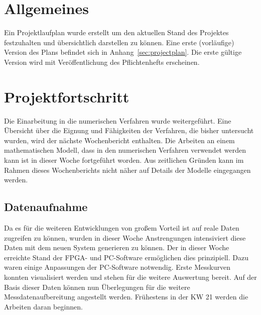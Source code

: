 \documentclass[a4paper,12pt,fleqn]{article}
\begin{document}
\setlength{\headheight}{36pt}

\begin{titlepage}



\end{titlepage}

\section[Allgemeines]{Allgemeines}
Ein Projektlaufplan wurde erstellt um den aktuellen Stand des Projektes festzuhalten und übersichtlich darstellen zu können. Eine erste (vorläufige) Version des Plans befindet sich in Anhang~\ref{sec:projectplan}. Die erste gültige Version wird mit Veröffentlichung des Pflichtenhefts erscheinen.

\section[Fortschritt]{Projektfortschritt}
Die Einarbeitung in die numerischen Verfahren wurde weitergeführt. Eine Übersicht über die Eignung und Fähigkeiten der Verfahren, die bisher untersucht wurden, wird der nächste Wochenbericht enthalten. Die Arbeiten an einem mathematischen Modell, dass in den numerischen Verfahren verwendet werden kann ist in dieser Woche fortgeführt worden. Aus zeitlichen Gründen kann im Rahmen dieses Wochenberichts nicht näher auf Details der Modelle eingegangen werden.

\subsection{Datenaufnahme}
Da es für die weiteren Entwicklungen von großem Vorteil ist auf reale Daten zugreifen zu können, wurden in dieser Woche Anstrengungen intensiviert diese Daten mit dem neuen System generieren zu können. Der in dieser Woche erreichte Stand der FPGA- und PC-Software ermöglichen dies prinzipiell. Dazu waren einige Anpassungen der PC-Software notwendig. Erste Messkurven konnten visualisiert werden und stehen für die weitere Auswertung bereit. Auf der Basis dieser Daten können nun Überlegungen für die weitere Messdatenaufbereitung angestellt werden. Frühestens in der KW 21 werden die Arbeiten daran beginnen.
\end{document}
